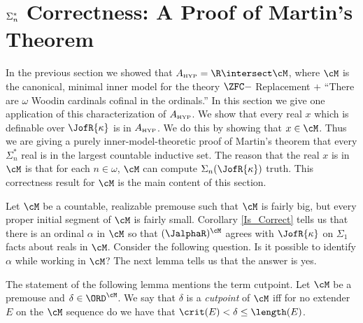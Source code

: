 
\skipbig

\section{$\protect{\Sigma^*_n}$ Correctness:  A Proof of Martin's Theorem}

\label{section:Martin_Theorem}

In the previous section we showed that $\Ahyp=\R\intersect\cM$,
where $\cM$ is the canonical, minimal inner model for the theory
$\ZFC -$ Replacement $+$ ``There are $\omega$ Woodin cardinals
cofinal in the ordinals.'' In this section we give one application
of this characterization of $A_{\mbox{\tiny HYP}}$. We show that every real
$x$ which is definable over $\JofR{\kappa}$ is in $A_{\mbox{\tiny HYP}}$.
We do this by showing that $x\in\cM$. Thus we are giving a purely
inner-model-theoretic proof of Martin's theorem that
every $\Sigma^*_n$ real is in the largest countable inductive set.
The reason that the real $x$ is in $\cM$ is that for each $n\in\omega$,
 $\cM$ can compute
$\Sigma_n(\JofR{\kappa})$ truth. This correctness result
for $\cM$ is
the main content of this section.



Let $\cM$ be a countable, realizable premouse such that $\cM$ is
fairly big, but every proper initial segment of $\cM$ is fairly
small. Corollary \ref{Is_Correct} tells us that
 there is an ordinal $\alpha$ in $\cM$ so that
$(\JalphaR)^{\cM}$ agrees with $\JofR{\kappa}$ on $\Sigma_1$
facts about reals in $\cM$. Consider the following question.
Is it possible to identify $\alpha$ while working in $\cM$? The
next lemma tells us that the answer is yes.

The statement of the following lemma mentions the term cutpoint. Let $\cM$
be a premouse and $\delta\in\ORD^{\cM}$. We say that $\delta$ is a
\emph{cutpoint} of $\cM$ iff for no extender $E$ on the $\cM$ sequence do
we have that $\crit(E)<\delta\leq\length(E)$.

